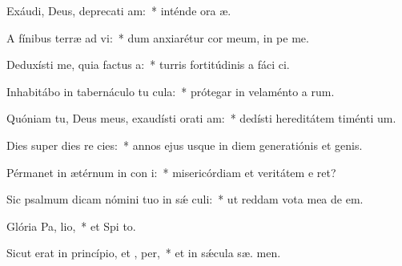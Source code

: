 \item Exáudi, Deus, deprecati am:~* inténde ora æ.
\item A fínibus terræ ad  vi:~* dum anxiarétur cor meum, in pe  me.
\item Deduxísti me, quia factus   a:~* turris fortitúdinis a fáci ci.
\item Inhabitábo in tabernáculo tu  cula:~* prótegar in velaménto a rum.
\item Quóniam tu, Deus meus, exaudísti orati am:~* dedísti hereditátem timénti  um.
\item Dies super dies re cies:~* annos ejus usque in diem generatiónis et genis.
\item Pérmanet in ætérnum in con i:~* misericórdiam et veritátem e  ret?
\item Sic psalmum dicam nómini tuo in sǽ culi:~* ut reddam vota mea de   em.
\item Glória Pa,  lio,~* et Spi to.
\item Sicut erat in princípio, et ,  per,~* et in sǽcula sæ. men.
